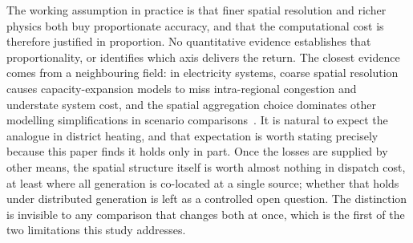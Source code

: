 The working assumption in practice is that finer spatial resolution and richer physics
both buy proportionate accuracy, and that the computational cost is therefore justified in
proportion. No quantitative evidence establishes that proportionality, or identifies which
axis delivers the return. The closest evidence comes from a neighbouring field: in
electricity systems, coarse spatial resolution causes capacity-expansion models to miss
intra-regional congestion and understate system cost, and the spatial aggregation choice
dominates other modelling simplifications in scenario
comparisons~\cite{Frysztacki2021}. It is natural to expect the analogue in district
heating, and that expectation is worth stating precisely because this paper finds it
holds only in part. Once the losses are supplied by other means, the spatial structure itself is worth
almost nothing in dispatch cost, at least where all generation is co-located at a
single source; whether that holds under distributed generation is left as a
controlled open question. The distinction is
invisible to any comparison that changes both at once, which is the first of the two
limitations this study addresses.
